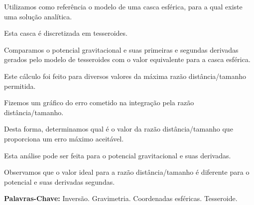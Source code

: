 \documentclass[12pt]{letter}
\begin{document}
\begin{flushleft}
Utilizamos como referência o modelo de uma casca esférica, para a qual existe
uma solução analítica.

Esta casca é discretizada em tesseroides.

Comparamos o potencial gravitacional e suas primeiras e segundas derivadas
gerados pelo modelo de tesseroides com o valor equivalente para a casca esférica.

Este cálculo foi feito para diversos valores da máxima razão distância/tamanho
permitida.

Fizemos um gráfico do erro cometido na integração pela razão
distância/tamanho.

Desta forma, determinamos qual é o valor da razão distância/tamanho que
proporciona um erro máximo aceitável.

Esta análise pode ser feita para o potencial gravitacional e suas derivadas.





Observamos que o valor ideal para a razão distância/tamanho é diferente para o
potencial e suas derivadas segundas.







\vspace{10 mm}
\textbf{Palavras-Chave:}
Inversão. Gravimetria. Coordenadas esféricas. Tesseroide.

\end{flushleft}
\end{document}
